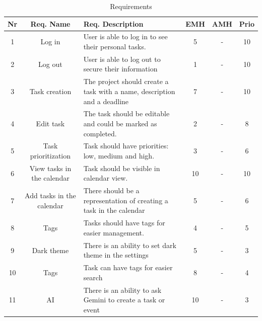 \documentclass{article}
\begin{document}
\begin{table}[H]
  \centering
  \begin{tabularx}{\textwidth}{|c|c|X|c|c|c|}
    \toprule
    \textbf{Nr} & \textbf{Req. Name}         & \textbf{Req. Description}                                                & \textbf{EMH} & \textbf{AMH} & \textbf{Prio} \\
    \hline
    1           & Log in                     & User is able to log in to see their personal tasks.                      & 5            & -            & 10            \\    \hline
    2           & Log out                    & User is able to log out to secure their information                      & 1            & -            & 10            \\    \hline
    3           & Task creation              & The project should create a task with a name, description and a deadline & 7            & -            & 10            \\
    \hline
    4           & Edit task                  & The task should be editable and could be marked as completed.            & 2            & -            & 8             \\
    \hline
    5           & Task prioritization        & Task should have priorities: low, medium and high.                       & 3            & -            & 6             \\
    \hline
    6           & View tasks in the calendar & Task should be visible in calendar view.                                 & 10           & -            & 10            \\
    \hline
    7           & Add tasks in the calendar  & There should be a representation of creating a task in the calendar      & 5            & -            & 6             \\
    \hline
    8           & Tags                       & Tasks should have tags for easier management.                            & 4            & -            & 5             \\
    \hline

    9           & Dark theme                 & There is an ability to set dark theme in the settings                    & 5            & -            & 3             \\    \hline
    10          & Tags                       & Task can have tags for easier search                                     & 8            & -            & 4             \\\hline
    11          & AI                         & There is an ability to ask Gemini to create a task or event              & 10           & -            & 3             \\

    \bottomrule
  \end{tabularx}
  \caption{Requirements}
  \label{Requirements with EMH, AMH, and priority}
\end{table}
\end{document}
